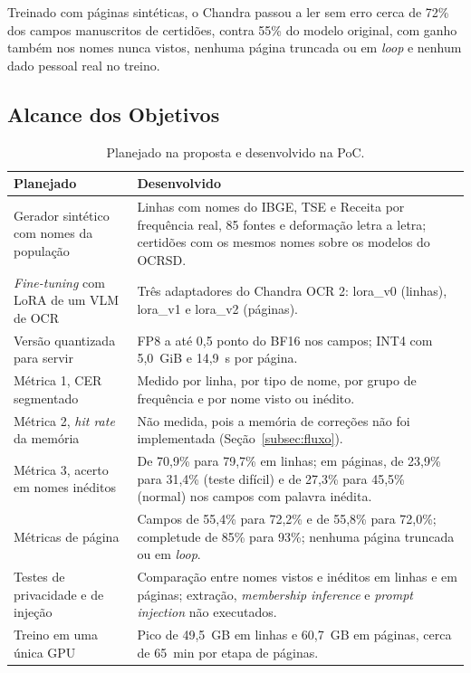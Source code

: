 Treinado com páginas sintéticas, o Chandra passou a ler sem erro cerca de 72\% dos campos manuscritos de certidões, contra 55\% do modelo original, com ganho também nos nomes nunca vistos, nenhuma página truncada ou em \emph{loop} e nenhum dado pessoal real no treino.

\subsection{Alcance dos Objetivos}

\begin{table}[H]
\centering
\small
\begin{tabular}{@{}p{5.2cm}p{9.6cm}@{}}
\toprule
Planejado & Desenvolvido \\
\midrule
Gerador sintético com nomes da população & Linhas com nomes do IBGE, TSE e Receita por frequência real, 85 fontes e deformação letra a letra; certidões com os mesmos nomes sobre os modelos do OCRSD. \\
\emph{Fine-tuning} com LoRA de um VLM de OCR & Três adaptadores do Chandra OCR 2: lora\_v0 (linhas), lora\_v1 e lora\_v2 (páginas). \\
Versão quantizada para servir & FP8 a até 0,5 ponto do BF16 nos campos; INT4 com 5,0~GiB e 14,9~s por página. \\
Métrica 1, CER segmentado & Medido por linha, por tipo de nome, por grupo de frequência e por nome visto ou inédito. \\
Métrica 2, \emph{hit rate} da memória & Não medida, pois a memória de correções não foi implementada (Seção~\ref{subsec:fluxo}). \\
Métrica 3, acerto em nomes inéditos & De 70,9\% para 79,7\% em linhas; em páginas, de 23,9\% para 31,4\% (teste difícil) e de 27,3\% para 45,5\% (normal) nos campos com palavra inédita. \\
Métricas de página & Campos de 55,4\% para 72,2\% e de 55,8\% para 72,0\%; completude de 85\% para 93\%; nenhuma página truncada ou em \emph{loop}. \\
Testes de privacidade e de injeção & Comparação entre nomes vistos e inéditos em linhas e em páginas; extração, \emph{membership inference} e \emph{prompt injection} não executados. \\
Treino em uma única GPU & Pico de 49,5~GB em linhas e 60,7~GB em páginas, cerca de 65~min por etapa de páginas. \\
\bottomrule
\end{tabular}
\caption{Planejado na proposta e desenvolvido na PoC.}
\label{tab:planejado}
\end{table}

